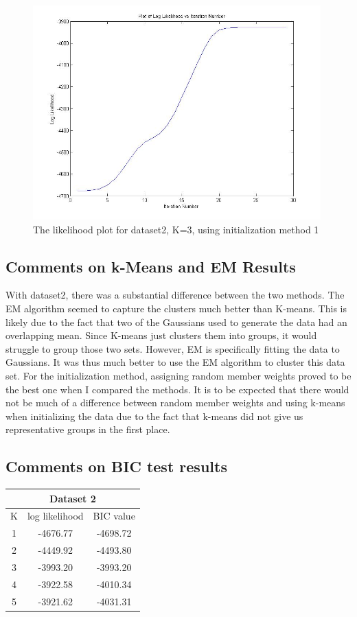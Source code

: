 \documentclass[11pt,psfig]{article}
\begin{document}
\begin{figure}[H]
\centering
\includegraphics[height=3.25in]{dataset2_EMlogLikelihoodPlot.jpg}
\caption{The likelihood plot for dataset2, K=3, using initialization method 1}
\end{figure}

\subsection{Comments on k-Means and EM Results}

With dataset2, there was a substantial difference between the two methods. The EM algorithm seemed to capture the clusters much better than K-means. This is likely due to the fact that two of the Gaussians used to generate the data had an overlapping mean. Since K-means just clusters them into groups, it would struggle to group those two sets. However, EM is specifically fitting the data to Gaussians. It was thus much better to use the EM algorithm to cluster this data set. For the initialization method, assigning random member weights proved to be the best one when I compared the methods. It is to be expected that there would not be much of a difference between random member weights and using k-means when initializing the data due to the fact that k-means did not give us representative groups in the first place. 

\subsection{Comments on BIC test results}

\begin{table}[H]
  \centering
  \begin{tabular}{|c|c|c|}
    \hline
    \multicolumn{3}{|c|}{Dataset 2} \\\hline
    K & log likelihood & BIC value \\\hline
    1 & -4676.77 & -4698.72 \\
		2 & -4449.92 & -4493.80 \\
		3 & -3993.20 & -3993.20 \\
		4 & -3922.58 & -4010.34 \\
    5 & -3921.62 & -4031.31 \\\hline
  \end{tabular}
\end{table}
\end{document}

